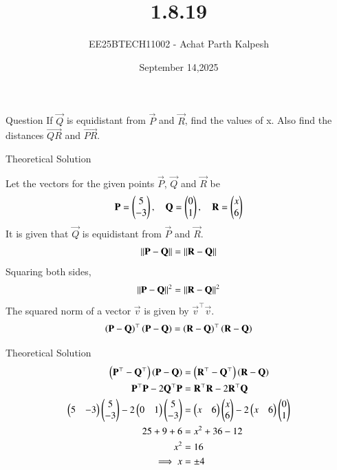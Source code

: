 \documentclass{beamer}
\title %
{1.8.19}
\date{September 14,2025}
\author %
{EE25BTECH11002 - Achat Parth Kalpesh}
\begin{document}
\frame{\titlepage}

\begin{frame}{Question}
If $\vec{Q}$ is equidistant from $\vec{P}$ and $\vec{R}$, find the values of x. Also find the distances $\vec{QR}$ and $\vec{PR}$.
\end{frame}



\begin{frame}{Theoretical Solution}

Let the vectors for the given points $\vec{P}$, $\vec{Q}$ and $\vec{R}$ be
\begin{align}
    \mathbf{P} = \begin{pmatrix}5 \\ -3\end{pmatrix}, \quad \mathbf{Q} = \begin{pmatrix}0 \\ 1\end{pmatrix}, \quad \mathbf{R} = \begin{pmatrix}x \\ 6\end{pmatrix}
\end{align}
It is given that $\vec{Q}$ is equidistant from $\vec{P}$ and $\vec{R}$.
\begin{align}
\left\lVert\mathbf{P} - \mathbf{Q}\right\rVert = \left\lVert\mathbf{R} - \mathbf{Q}\right\rVert
\end{align}
Squaring both sides,
\begin{align}
\left\lVert\mathbf{P} - \mathbf{Q}\right\rVert^2 = \left\lVert\mathbf{R} - \mathbf{Q}\right\rVert^2
\end{align}
The squared norm of a vector $\vec{v}$ is given by $\vec{v}^\top\vec{v}$.
\begin{align}
\left(\mathbf{P} - \mathbf{Q}\right)^\top \left(\mathbf{P} - \mathbf{Q}\right) = \left(\mathbf{R} - \mathbf{Q}\right)^\top \left(\mathbf{R} - \mathbf{Q}\right)
\end{align}

\end{frame}

\begin{frame}{Theoretical Solution}
\begin{align}
\left(\mathbf{P}^{\top} - \mathbf{Q}^{\top}\right) \left(\mathbf{P} - \mathbf{Q}\right) &= \left(\mathbf{R}^{\top} - \mathbf{Q}^{\top}\right) \left(\mathbf{R} - \mathbf{Q}\right)\\
\mathbf{P}^{\top}\mathbf{P} - 2\mathbf{Q}^{\top}\mathbf{P} &= \mathbf{R}^{\top} \mathbf{R} - 2\mathbf{R}^{\top}\mathbf{Q}\\
\begin{pmatrix}5 & -3\end{pmatrix}\begin{pmatrix}5 \\ -3\end{pmatrix} - 2\begin{pmatrix}0 & 1\end{pmatrix}\begin{pmatrix}5 \\ -3\end{pmatrix} &= \begin{pmatrix}x & 6\end{pmatrix}\begin{pmatrix}x \\ 6\end{pmatrix} - 2\begin{pmatrix}x & 6\end{pmatrix}\begin{pmatrix}0 \\ 1\end{pmatrix}\\
25 + 9 + 6 &= x^2 + 36 -12 \\
x^2 &= 16 \\
    \implies x &= \pm 4
\end{align}

\end{frame}
\end{document}
